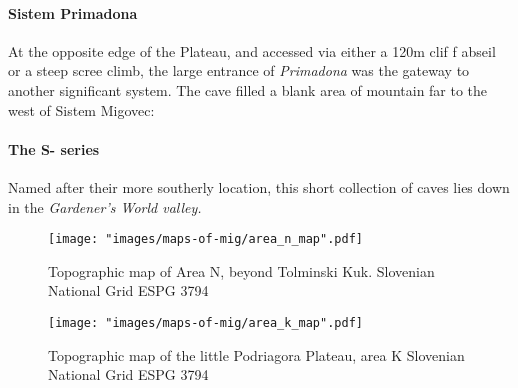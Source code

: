 \paragraph{Sistem Primadona} At the opposite edge of the Plateau, and accessed via either a 120m clif f abseil or a steep scree climb, the large entrance of \emph{Primadona} was the gateway to another significant system. The cave filled a blank area of mountain far to the west of Sistem Migovec: 

\paragraph{The S- series} Named after their more southerly location, this short collection of caves lies down in   the \emph{Gardener's World valley.}

 
 \begin{figure*}[t!]
 \checkoddpage \ifoddpage \forcerectofloat \else \forceversofloat \fi
\centering
  \texttt{[image: "images/maps-of-mig/area\_n\_map".pdf]}
  \label{map m}
  \caption{Topographic map of Area N, beyond Tolminski Kuk. Slovenian National Grid ESPG 3794}
 \end{figure*}
 
 \begin{figure*}[t!]
 \checkoddpage \ifoddpage \forcerectofloat \else \forceversofloat \fi
\centering
  \texttt{[image: "images/maps-of-mig/area\_k\_map".pdf]}
  \label{map m}
  \caption{Topographic map of the little Podriagora Plateau, area K Slovenian National Grid ESPG 3794}
 \end{figure*}
 
 